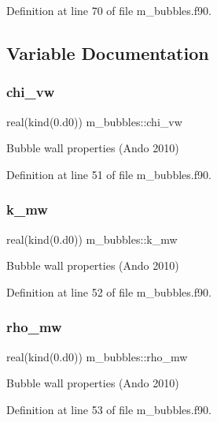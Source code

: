 Definition at line 70 of file m\+\_\+bubbles.\+f90.



\subsection{Variable Documentation}
\mbox{\label{namespacem__bubbles_afaab8f73b4f1cc413ad9ee2c2d32512a}} 
\subsubsection{\texorpdfstring{chi\+\_\+vw}{chi\_vw}}
{\footnotesize\ttfamily real(kind(0.d0)) m\+\_\+bubbles\+::chi\+\_\+vw}



Bubble wall properties (Ando 2010) 



Definition at line 51 of file m\+\_\+bubbles.\+f90.

\mbox{\label{namespacem__bubbles_a1ffd14079710afb89dad86916cbb91fc}} 
\subsubsection{\texorpdfstring{k\+\_\+mw}{k\_mw}}
{\footnotesize\ttfamily real(kind(0.d0)) m\+\_\+bubbles\+::k\+\_\+mw}



Bubble wall properties (Ando 2010) 



Definition at line 52 of file m\+\_\+bubbles.\+f90.

\mbox{\label{namespacem__bubbles_adeca2bd43645a6f7bcd59c88151eb3bc}} 
\subsubsection{\texorpdfstring{rho\+\_\+mw}{rho\_mw}}
{\footnotesize\ttfamily real(kind(0.d0)) m\+\_\+bubbles\+::rho\+\_\+mw}



Bubble wall properties (Ando 2010) 



Definition at line 53 of file m\+\_\+bubbles.\+f90.

